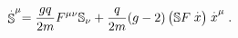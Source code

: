 \begin{equation}
\stackrel{.}{\Bbb{S}}^{\mu }=\frac{gq}{2m}F^{\mu \nu }\Bbb{S}_{\nu }+\frac{q%
}{2m}(g-2)\left( \Bbb{S}F\stackrel{.}{x}\right) \stackrel{.}{x}^{\mu }.
\label{BMT}
\end{equation}

